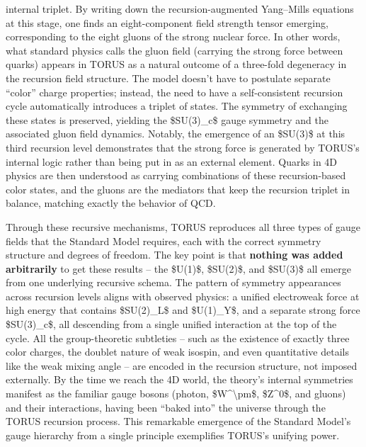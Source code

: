 \documentclass[
]{article}
\begin{document}
\begin{itemize}
  internal triplet\hspace{0pt}. By writing down the recursion-augmented
  Yang--Mills equations at this stage, one finds an eight-component
  field strength tensor emerging, corresponding to the eight gluons of
  the strong nuclear force\hspace{0pt}. In other words, what standard
  physics calls the gluon field (carrying the strong force between
  quarks) appears in TORUS as a natural outcome of a three-fold
  degeneracy in the recursion field structure\hspace{0pt}. The model
  doesn't have to postulate separate ``color'' charge properties;
  instead, the need to have a self-consistent recursion cycle
  automatically introduces a triplet of states. The symmetry of
  exchanging these states is preserved, yielding the \$SU(3)\_c\$ gauge
  symmetry and the associated gluon field dynamics\hspace{0pt}. Notably,
  the emergence of an \$SU(3)\$ at this third recursion level
  demonstrates that the strong force is generated by TORUS's internal
  logic rather than being put in as an external element\hspace{0pt}.
  Quarks in 4D physics are then understood as carrying combinations of
  these recursion-based color states, and the gluons are the mediators
  that keep the recursion triplet in balance, matching exactly the
  behavior of QCD.
\end{itemize}

Through these recursive mechanisms, TORUS reproduces all three types of
gauge fields that the Standard Model requires, each with the correct
symmetry structure and degrees of freedom. The key point is that
\textbf{nothing was added arbitrarily} to get these results -- the
\$U(1)\$, \$SU(2)\$, and \$SU(3)\$ all emerge from one underlying
recursive schema. The pattern of symmetry appearances across recursion
levels aligns with observed physics: a unified electroweak force at high
energy that contains \$SU(2)\_L\$ and \$U(1)\_Y\$, and a separate strong
force \$SU(3)\_c\$, all descending from a single unified interaction at
the top of the cycle\hspace{0pt}. All the group-theoretic subtleties --
such as the existence of exactly three color charges, the doublet nature
of weak isospin, and even quantitative details like the weak mixing
angle -- are encoded in the recursion structure, not imposed
externally\hspace{0pt}. By the time we reach the 4D world, the theory's
internal symmetries manifest as the familiar gauge bosons (photon,
\$W\^{}\textbackslash pm\$, \$Z\^{}0\$, and gluons) and their
interactions, having been ``baked into'' the universe through the TORUS
recursion process. This remarkable emergence of the Standard Model's
gauge hierarchy from a single principle exemplifies TORUS's unifying
power.
\end{document}
